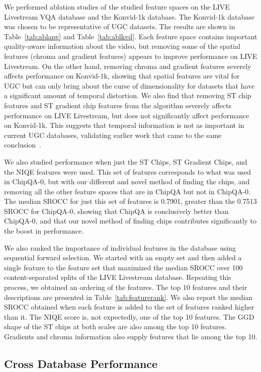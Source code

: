 \documentclass[journal]{IEEEtran}
\begin{document}
We performed ablation studies of the studied feature spaces on the LIVE Livestream VQA database and the Konvid-1k database. The Konvid-1k database was chosen to be representative of UGC datasets. The results are shown in Table~\ref{tab:ablapv} and Table~\ref{tab:ablkvd}. Each feature space contains important quality-aware information about the video, but removing some of the spatial features (chroma and gradient features) appears to improve performance on LIVE Livestream. On the other hand, removing chroma and gradient features severely affects performance on Konvid-1k, showing that spatial features are vital for UGC but can only bring about the curse of dimensionality for datasets that have a significant amount of temporal distortion. We also find that removing ST chip features and ST gradient chip features from the algorithm severely affects performance on LIVE Livestream, but does not significantly affect performance on Konvid-1k. This suggests that temporal information is not as important in current UGC databases, validating earlier work that came to the same conclusion~\cite{videval,pooling}. 

We also studied performance when just the ST Chips, ST Gradient Chips, and the NIQE features were used. This set of features corresponds to what was used in ChipQA-0, but with our different and novel method of finding the chips, and removing all the other feature spaces that are in ChipQA but not in ChipQA-0. The median SROCC for just this set of features is 0.7901, greater than the 0.7513 SROCC for ChipQA-0, showing that ChipQA is conclusively better than ChipQA-0, and that our novel method of finding chips contributes significantly to the boost in performance.

We also ranked the importance of individual features in the database using sequential forward selection. We started with an empty set and then added a single feature to the feature set that maximized the median SROCC over 100 content-separated splits of the LIVE Livestream database. Repeating this process, we obtained an ordering of the features. The top 10 features and their descriptions are presented in Table~\ref{tab:featurerank}. We also report the median SROCC obtained when each feature is added to the set of features ranked higher than it. The NIQE score is, not expectedly, one of the top 10 features. The GGD shape of the ST chips at both scales are also among the top 10 features. {Gradients and chroma information also supply features that lie among the top 10.}

\subsection{Cross Database Performance}
\end{document}
